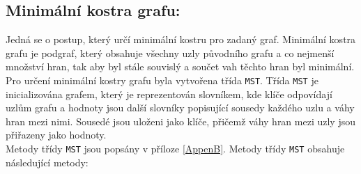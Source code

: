 \subsection{Minimální kostra grafu:}
Jedná se o postup, který určí minimální kostru pro zadaný graf. Minimální kostra grafu je podgraf, který obsahuje všechny uzly původního grafu a co nejmenší množství hran, tak aby byl stále souvislý a součet vah těchto hran byl minimální. Pro určení minimální kostry grafu byla vytvořena třída \texttt{MST}. Třída \texttt{MST} je inicializována grafem, který je reprezentován slovníkem, kde klíče odpovídají uzlům grafu a hodnoty jsou další slovníky popisující sousedy každého uzlu a váhy hran mezi nimi. Sousedé jsou uloženi jako klíče, přičemž váhy hran mezi uzly jsou přiřazeny jako hodnoty.\\
Metody třídy \texttt{MST} jsou popsány v příloze \ref{AppenB}. Metody třídy \texttt{MST} obsahuje následující metody:
